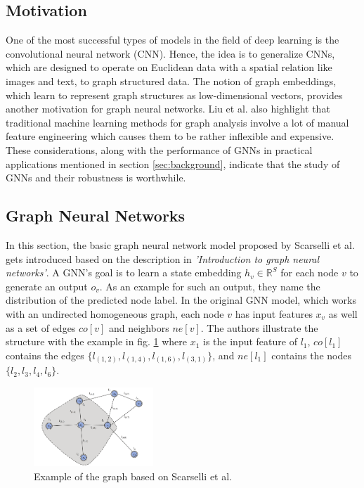 \documentclass[a4paper,preprint]{sig-alternate}
\begin{document}
\subsection{Motivation}

One of the most successful types of models in the field of deep learning is the convolutional neural network (CNN).
Hence, the idea is to generalize CNNs, which are designed to operate on Euclidean data with a spatial relation like 
images and text, to graph structured data. \cite{Liu_2020}
The notion of graph embeddings, which learn to represent graph structures as low-dimensional vectors, provides
another motivation for graph neural networks. \cite{Liu_2020}
Liu et al. also highlight that traditional machine learning methods for graph analysis involve a lot of manual feature engineering
which causes them to be rather inflexible and expensive.
These considerations, along with the performance of GNNs in practical applications mentioned in section \ref{sec:background}, 
indicate that the study of GNNs and their robustness is worthwhile.

\vfill
\pagebreak

\subsection{Graph Neural Networks}

In this section, the basic graph neural network model proposed by Scarselli et al. \cite{Scarselli_2009} gets introduced
based on the description in \textit{'Introduction to graph neural networks'}\cite{Liu_2020}.
A GNN's goal is to learn a state embedding $h_v \in \mathbb{R}^S$ for each node $v$ to generate an output $o_v$.
As an example for such an output, they name the distribution of the predicted node label.
In the original GNN model, which works with an undirected homogeneous graph, each node $v$ has input features $x_v$
as well as a set of edges $co[v]$ and neighbors $ne[v]$. 
The authors illustrate the structure with the example in fig. \ref{fig:graph}
where $x_{1}$ is the input feature of $l_1$, $co[l_1]$ contains the edges $\{l_{(1, 2)}, l_{(1, 4)}, l_{(1, 6)}, l_{(3, 1)}\}$, and 
$ne[l_1]$ contains the nodes $\{l_2, l_3, l_4, l_6\}$.

\begin{figure}[h]
    \centering
    \includegraphics[width=0.4\textwidth]{img/graph.png}
    \caption{Example of the graph based on Scarselli et al. \cite{Liu_2020}}
    \label{fig:graph}
\end{figure}
\end{document}
